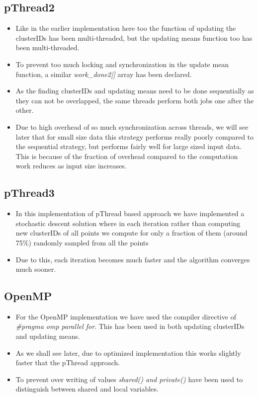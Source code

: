 \documentclass[a4paper, 11pt]{article}
\begin{document}
\subsection{pThread2}

\begin{itemize}
    \item Like in the earlier implementation here too the function of updating the clusterIDs has been multi-threaded, but the updating means function too has been multi-threaded.
    \item To prevent too much locking and synchronization in the update mean function, a similar \textit{work\_done2[]} array has been declared.
    \item As the finding clusterIDs and updating means need to be done sequentially as they can not be overlapped, the same threads perform both jobs one after the other.
    \item Due to high overhead of so much synchronization across threads, we will see later that for small size data this strategy performs really poorly compared to the sequential strategy, but performs fairly well for large sized input data. This is because of the fraction of overhead compared to the computation work reduces as input size increases.
\end{itemize}

\subsection{pThread3}

\begin{itemize}
    \item In this implementation of pThread based approach we have implemented a stochastic descent solution where in each iteration rather than computing new clusterIDs of all points we compute for only a fraction of them (around 75\%) randomly sampled from all the points
    \item Due to this, each iteration becomes much faster and the algorithm converges much sooner.
\end{itemize}

\subsection{OpenMP}

\begin{itemize}
    \item For the OpenMP implementation we have used the compiler directive of \textit{#pragma omp parallel for}. This has been used in both updating clusterIDs and updating means.
    \item As we shall see later, due to optimized implementation this works slightly faster that the pThread approach.
    \item To prevent over writing of values \textit{shared() and private()} have been used to distinguish between shared and local variables.
\end{itemize}
\end{document}
